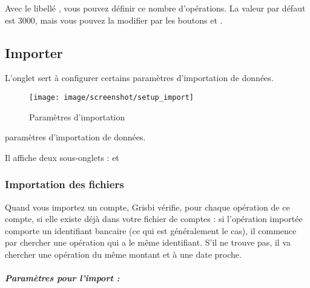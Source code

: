 Avec le libellé , vous pouvez définir ce nombre d'opérations. La valeur par défaut est 3000, mais vous pouvez la modifier par les boutons \menu{+} et \menu{-}.


\subsection{Importer\label{setup-general-import}}

L'onglet  sert à configurer certains \ifIllustration paramètres d'importation de données.
\begin{figure}[htbp]
\begin{center}
\texttt{[image: image/screenshot/setup\_import]}
\end{center}
\caption{Paramètres d'importation}
\label{setup-import-img}
\end{figure}
\else paramètres d'importation de données.
\fi

Il affiche deux sous-onglets :  et 

\subsubsection{Importation des fichiers\label{setup-general-import-files}} 



Quand vous importez un compte, Grisbi vérifie, pour chaque opération de ce compte, si elle existe déjà dans votre fichier de comptes : si l'opération importée comporte un identifiant bancaire (ce qui est généralement le cas), il commence par chercher une opération qui a le même identifiant. S'il ne trouve pas, il va chercher une opération du même montant et à une date proche.


\subparagraph{Paramètres pour l'import :\label{setup-general-import-files-parameters}}



